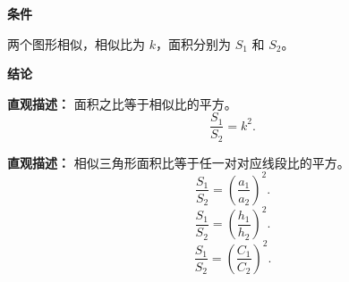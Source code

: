 \begin{statementbox}
	\textbf{\textcolor{CStatement}{条件}}
	\begin{description}[style=nextline, leftmargin=2.8em, labelsep=0.5em, itemsep=0.35em]
		\item[\textbf{\textcolor{CStatement}{条件 1（两个相似图形）：}}] 两个图形相似，相似比为 $k$，面积分别为 $S_1$ 和 $S_2$。
	\end{description}

	\textbf{\textcolor{CStatement}{结论}}
	\begin{description}[style=nextline, leftmargin=2.8em, labelsep=0.5em, itemsep=0.45em]
		\item[\textbf{\textcolor{CStatement}{结论一（面积比公式）：}}]
			\textbf{\textcolor{CStatement}{直观描述：}}
			面积之比等于相似比的平方。
			\[
				\frac{S_1}{S_2}=k^2.
			\]

		\item[\textbf{\textcolor{CStatement}{推广结论（对应线段平方比）：}}]
			\textbf{\textcolor{CStatement}{直观描述：}}
			相似三角形面积比等于任一对对应线段比的平方。
			\[
				\frac{S_1}{S_2} = \left(\frac{a_1}{a_2}\right)^2.
			\]
			\[
				\frac{S_1}{S_2} = \left(\frac{h_1}{h_2}\right)^2.
			\]
			\[
				\frac{S_1}{S_2} = \left(\frac{C_1}{C_2}\right)^2.
			\]
	\end{description}
\end{statementbox}
